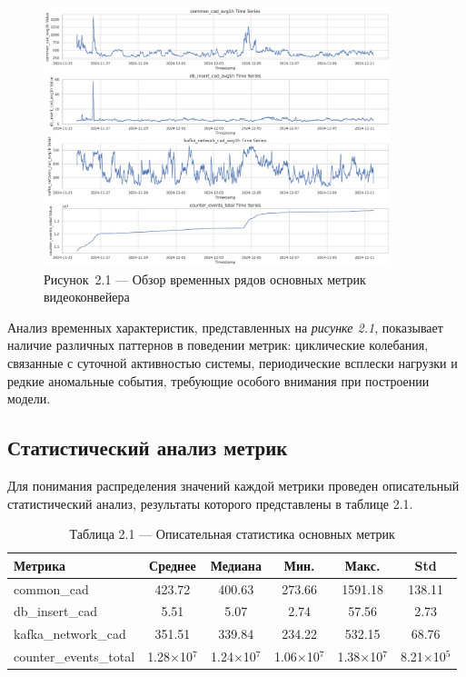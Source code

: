 \begin{figure}[H]
	\centering
	\includegraphics[width=0.9\textwidth]{figures/chapter2/time_series_overview.png}
	\caption*{Рисунок~2.1 --- Обзор временных рядов основных метрик видеоконвейера}
	\label{fig:time_series_overview}
\end{figure}

\hspace*{1.25cm}Анализ временных характеристик, представленных на \textit{рисунке 2.1}, показывает наличие различных паттернов в поведении метрик: циклические колебания, связанные с суточной активностью системы, периодические всплески нагрузки и редкие аномальные события, требующие особого внимания при построении модели.

\subsection{Статистический анализ метрик}

\hspace*{1.25cm}Для понимания распределения значений каждой метрики проведен описательный статистический анализ, результаты которого представлены в таблице 2.1.

\begin{table}[H]
	\centering
	\caption*{Таблица 2.1 --- Описательная статистика основных метрик}
	\begin{tabular}{|l|c|c|c|c|c|}
		\hline
		\textbf{Метрика} & \textbf{Среднее} & \textbf{Медиана} & \textbf{Мин.} & \textbf{Макс.} & \textbf{Std} \\
		\hline
		common\_cad & 423.72 & 400.63 & 273.66 & 1591.18 & 138.11 \\
		db\_insert\_cad & 5.51 & 5.07 & 2.74 & 57.56 & 2.73 \\
		kafka\_network\_cad & 351.51 & 339.84 & 234.22 & 532.15 & 68.76 \\
		counter\_events\_total & 1.28$\times$10$^{7}$ & 1.24$\times$10$^{7}$ & 1.06$\times$10$^{7}$ & 1.38$\times$10$^{7}$ & 8.21$\times$10$^{5}$ \\
		\hline
	\end{tabular}
	\label{tab:descriptive_stats}
\end{table}


